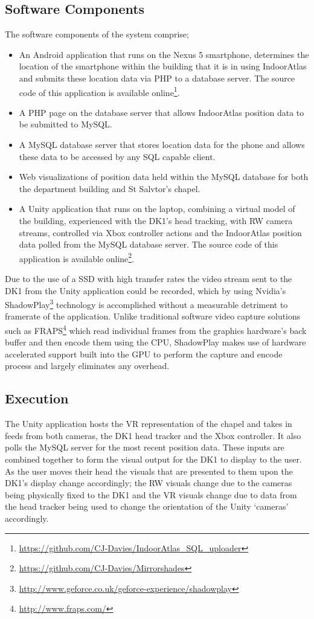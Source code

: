 \subsection{Software Components}
The software components of the system comprise;
\begin{itemize}
	\item An Android application that runs on the Nexus 5 smartphone, determines the location of the smartphone within the building that it is in using IndoorAtlas and submits these location data via PHP to a database server. The source code of this application is available online\footnote{\url{https://github.com/CJ-Davies/IndoorAtlas_SQL_uploader}}.
	\item A PHP page on the database server that allows IndoorAtlas position data to be submitted to MySQL.
	\item A MySQL database server that stores location data for the phone and allows these data to be accessed by any SQL capable client.
	\item Web visualizations of position data held within the MySQL database for both the department building and St Salvtor's chapel.
	\item A Unity application that runs on the laptop, combining a virtual model of the building, experienced with the DK1's head tracking, with RW camera streams, controlled via Xbox controller actions and the IndoorAtlas position data polled from the MySQL database server. The source code of this application is available online\footnote{\url{https://github.com/CJ-Davies/Mirrorshades}}.
\end{itemize}

Due to the use of a SSD with high transfer rates the video stream sent to the DK1 from the Unity application could be recorded, which by using Nvidia's ShadowPlay\footnote{\url{http://www.geforce.co.uk/geforce-experience/shadowplay}} technology is accomplished without a measurable detriment to framerate of the application. Unlike traditional software video capture solutions such as FRAPS\footnote{\url{http://www.fraps.com/}} which read individual frames from the graphics hardware's back buffer and then encode them using the CPU, ShadowPlay makes use of hardware accelerated support built into the GPU to perform the capture and encode process and largely eliminates any overhead.

\subsection{Execution}
The Unity application hosts the VR representation of the chapel and takes in feeds from both cameras, the DK1 head tracker and the Xbox controller. It also polls the MySQL server for the most recent position data. These inputs are combined together to form the visual output for the DK1 to display to the user. As the user moves their head the visuals that are presented to them upon the DK1's display change accordingly; the RW visuals change due to the cameras being physically fixed to the DK1 and the VR visuals change due to data from the head tracker being used to change the orientation of the Unity `cameras' accordingly.


